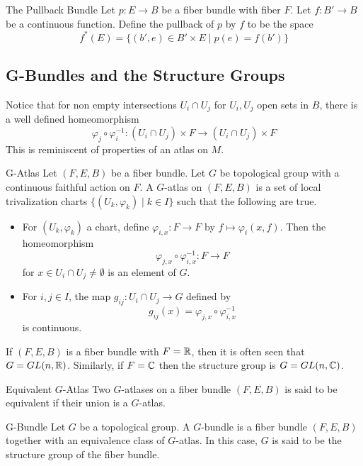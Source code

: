 \documentclass[a4paper]{article}
\begin{document}
\begin{defn}{The Pullback Bundle}{} Let $p:E\to B$ be a fiber bundle with fiber $F$. Let $f:B'\to B$ be a continuous function. Define the pullback of $p$ by $f$ to be the space $$f^\ast(E)=\{(b',e)\in B'\times E\;|\;p(e)=f(b')\}$$
\end{defn}

\subsection{G-Bundles and the Structure Groups}
Notice that for non empty intersections $U_i\cap U_j$ for $U_i,U_j$ open sets in $B$, there is a well defined homeomorphism $$\varphi_j\circ\varphi_i^{-1}:(U_i\cap U_j)\times F\to(U_i\cap U_j)\times F$$ This is reminiscent of properties of an atlas on $M$. 

\begin{defn}{G-Atlas}{} Let $(F,E,B)$ be a fiber bundle. Let $G$ be topological group with a continuous faithful action on $F$. A $G$-atlas on $(F,E,B)$ is a set of local trivalization charts $\{(U_k,\varphi_k)\;|\;k\in I\}$ such that the following are true. 
\begin{itemize}
\item For $(U_k,\varphi_k)$ a chart, define $\varphi_{i,x}:F\to F$ by $f\mapsto\varphi_i(x,f)$. Then the homeomorphism $$\varphi_{j,x}\circ\varphi_{i,x}^{-1}:F\to F$$ for $x\in U_i\cap U_j\neq\emptyset$ is an element of $G$. 
\item For $i,j\in I$, the map $g_{ij}:U_i\cap U_j\to G$ defined by $$g_{ij}(x)=\varphi_{j,x}\circ\varphi_{i,x}^{-1}$$ is continuous. 
\end{itemize}
\end{defn}

If $(F,E,B)$ is a fiber bundle with $F=\mathbb{R}$, then it is often seen that $G=GL(n,\mathbb{R})$. Similarly, if $F=\mathbb{C}$ then the structure group is $G=GL(n,\mathbb{C})$. 

\begin{defn}{Equivalent $G$-Atlas}{} Two $G$-atlases on a fiber bundle $(F,E,B)$ is said to be equivalent if their union is a $G$-atlas. 
\end{defn}

\begin{defn}{G-Bundle}{} Let $G$ be a topological group. A $G$-bundle is a fiber bundle $(F,E,B)$ together with an equivalence class of $G$-atlas. In this case, $G$ is said to be the structure group of the fiber bundle. 
\end{defn}
\end{document}
